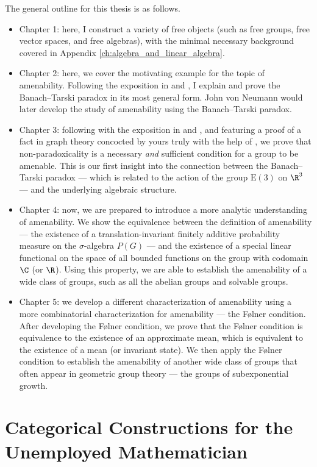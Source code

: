 \documentclass[10pt]{package2}
\begin{document}
The general outline for this thesis is as follows.
\begin{itemize}
  \item Chapter 1: here, I construct a variety of free objects (such as free groups, free vector spaces, and free algebras), with the minimal necessary background covered in Appendix \ref{ch:algebra_and_linear_algebra}.
  \item Chapter 2: here, we cover the motivating example for the topic of amenability. Following the exposition in \cite{lectures_on_amenability} and \cite{amenable_banach_algebras}, I explain and prove the Banach--Tarski paradox in its most general form. John von Neumann would later develop the study of amenability using the Banach--Tarski paradox.
  \item Chapter 3: following with the exposition in \cite{lectures_on_amenability} and \cite{amenable_banach_algebras}, and featuring a proof of a fact in graph theory concocted by yours truly with the help of \cite{marshall_hall_thm}, we prove that non-paradoxicality is a necessary \textit{and} sufficient condition for a group to be amenable. This is our first insight into the connection between the Banach--Tarski paradox --- which is related to the action of the group $\text{E}(3)$ on $\R^3$ --- and the underlying algebraic structure.
  \item Chapter 4: now, we are prepared to introduce a more analytic understanding of amenability. We show the equivalence between the definition of amenability --- the existence of a translation-invariant finitely additive probability measure on the $\sigma$-algebra $P(G)$ --- and the existence of a special linear functional on the space of all bounded functions on the group with codomain $\C$ (or $\R$). Using this property, we are able to establish the amenability of a wide class of groups, such as all the abelian groups and solvable groups.
  \item Chapter 5: we develop a different characterization of amenability using a more combinatorial characterization for amenability --- the Følner condition. After developing the Følner condition, we prove that the Følner condition is equivalence to the existence of an approximate mean, which is equivalent to the existence of a mean (or invariant state). We then apply the Følner condition to establish the amenability of another wide class of groups that often appear in geometric group theory --- the groups of subexponential growth.
\end{itemize}
\chapter{Categorical Constructions for the Unemployed Mathematician}\label{ch:categorical_constructions}

\end{document}
